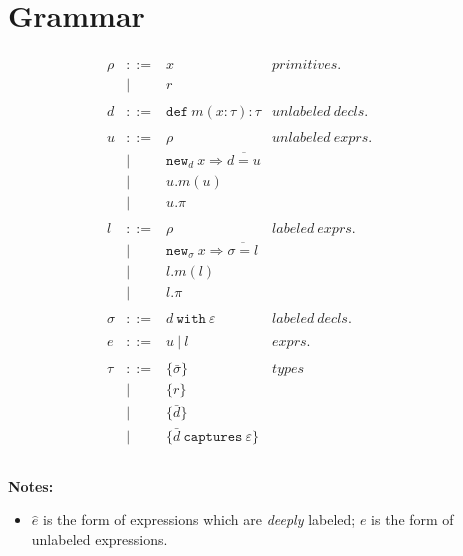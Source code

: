 \documentclass{llncs}
\newcommand{\keywadj}[1]{\mathtt{#1}}
\newcommand{\keyw}[1]{\keywadj{#1}~}
\newcommand{\newd}[0]{
	\keywadj{new}_d~x \Rightarrow \overline{d = u}
}
\newcommand{\newsig}[0]{
	\keywadj{new}_\sigma~x \Rightarrow \overline{\sigma = l}
}
\begin{document}
\section{Grammar}

\[
\begin{array}{lll}

\begin{array}{lllr}

\rho & ::= & x & primitives.\\
		& | & r \\
		&&\\

d & ::= & \keyw{def} m(x:\tau):\tau & unlabeled~decls.\\
		&&\\

u & ::= & \rho & unlabeled~exprs. \\
 		& | & \newd \\
 		& | & u.m(u)\\
 		& | & u.\pi\\
		&&\\
		
l & ::= & \rho & labeled~exprs. \\
	& | & \newsig \\
	& | & l.m(l) \\
	& | & l.\pi \\
	&&\\

\sigma & ::= & d~\keyw{with}\varepsilon  & labeled~ decls.\\
		&&\\

e & ::= & u~|~l & exprs. \\
	&&\\

\tau & ::= & \{ \bar \sigma \} & types \\
		& | & \{ r \} \\
		& | & \{ \bar d \} \\
		& | & \{ \bar d ~\keyw{captures} \varepsilon \} \\
		&&\\
		
\end{array}
& ~~~~~~
&
\end{array}
\]

\noindent \textbf{Notes:}

\begin{itemize}
	\item $\hat e$ is the form of expressions which are \textit{deeply} labeled; $e$ is the form of unlabeled expressions.
\end{itemize}
\end{document}
